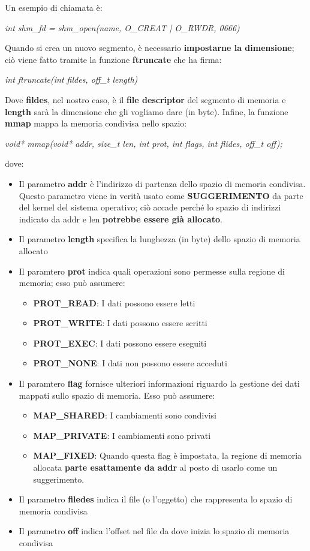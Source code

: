 \documentclass[12pt]{article}
\begin{document}
Un esempio di chiamata è:
\begin{center}
    \textit{int shm\_fd = shm\_open(name, O\_CREAT | O\_RWDR, 0666)}
\end{center}
Quando si crea un nuovo segmento, è necessario \textbf{impostarne la dimensione}; ciò viene fatto tramite la funzione
\textbf{ftruncate} che ha firma:
\begin{center}
    \textit{int ftruncate(int fildes, off\_t length)}
\end{center}
Dove \textbf{fildes}, nel nostro caso, è il \textbf{file descriptor} del segmento di memoria e \textbf{length} sarà la dimensione
che gli vogliamo dare (in byte).
Infine, la funzione \textbf{mmap} mappa la memoria condivisa nello spazio:
\begin{center}
    \textit{void* mmap(void* addr, size\_t len, int prot, int flags, int flides, off\_t off);}
\end{center}
dove:
\begin{itemize}
    \item Il parametro \textbf{addr} è l'indirizzo di partenza dello spazio di memoria condivisa. Questo parametro viene in verità usato come
    \textbf{SUGGERIMENTO} da parte del kernel del sistema operativo; ciò accade perché lo spazio di indirizzi indicato da addr e len \textbf{potrebbe essere già allocato}.
    \item Il parametro \textbf{length} specifica la lunghezza (in byte) dello spazio di memoria allocato
    \item Il paramtero \textbf{prot} indica quali operazioni sono permesse sulla regione di memoria; esso può assumere:
    \begin{itemize}
        \item \textbf{PROT\_READ}: I dati possono essere letti
        \item \textbf{PROT\_WRITE}: I dati possono essere scritti
        \item \textbf{PROT\_EXEC}: I dati possono essere eseguiti
        \item \textbf{PROT\_NONE}: I dati non possono essere acceduti
    \end{itemize}
    \item Il paramtero \textbf{flag} fornisce ulteriori informazioni riguardo la gestione dei dati mappati sullo spazio di memoria. Esso può assumere:
    \begin{itemize}
        \item \textbf{MAP\_SHARED}: I cambiamenti sono condivisi
        \item \textbf{MAP\_PRIVATE}: I cambiamenti sono privati
        \item \textbf{MAP\_FIXED}: Quando questa flag è impostata, la regione di memoria allocata \textbf{parte esattamente da addr} al posto di usarlo come un suggerimento.
    \end{itemize}
    \item Il parametro \textbf{filedes} indica il file (o l'oggetto) che rappresenta lo spazio di memoria condivisa
    \item Il parametro \textbf{off} indica l'offset nel file da dove inizia lo spazio di memoria condivisa
\end{itemize}
\end{document}
